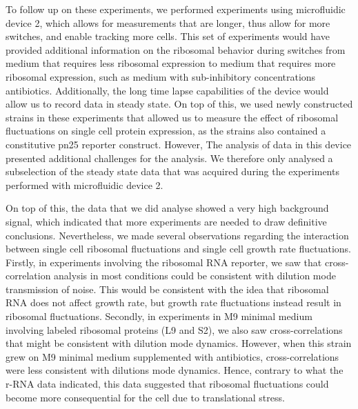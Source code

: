 To follow up on these experiments, we performed experiments using microfluidic device 2, which allows for measurements that are longer, thus allow for more switches, and enable tracking more cells. 
%
This set of experiments would have provided additional information on the ribosomal behavior during switches from medium that requires less ribosomal expression to medium that requires more ribosomal expression, such as medium with sub-inhibitory concentrations antibiotics.
Additionally, the long time lapse capabilities of the device would allow us to record data in steady state.
On top of this, we used newly constructed strains in these experiments that allowed us to measure the effect of ribosomal fluctuations on single cell protein expression, as the strains also contained a constitutive pn25 reporter construct.
%
However, The analysis of data in this device presented additional challenges for the analysis.
%
We therefore only analysed a subselection of the steady state data that was acquired during the experiments performed with microfluidic device 2.

On top of this, the data that we did analyse showed a very high background signal, which indicated that more experiments are needed to draw definitive conclusions.
%
Nevertheless, we made several observations regarding the interaction between single cell ribosomal fluctuations and single cell growth rate fluctuations.
%
Firstly, in experiments involving the ribosomal RNA reporter, we saw that cross-correlation analysis in most conditions could be consistent with dilution mode transmission of noise.
This would be consistent with the idea that ribosomal RNA does not affect growth rate, but growth rate fluctuations instead result in ribosomal fluctuations.
%
Secondly, in experiments in M9 minimal medium involving labeled ribosomal proteins (L9 and S2), we also saw cross-correlations that might be consistent with dilution mode dynamics.
However, when this strain grew on M9 minimal medium supplemented with antibiotics, cross-correlations were less consistent with dilutions mode dynamics.
Hence, contrary to what the r-RNA data indicated, this data suggested that ribosomal fluctuations could become more consequential for the cell due to translational stress.

